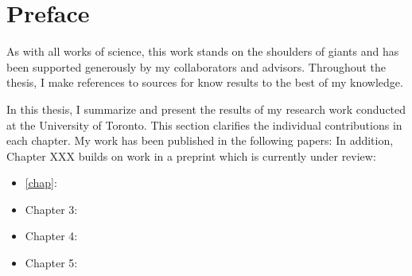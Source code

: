 \chapter*{Preface}

As with all works of science, this work stands on the shoulders of giants and has been supported generously by my collaborators and advisors.
Throughout the thesis, I make references to sources for know results to the best of my knowledge.


In this thesis, I summarize and present the results of my research work conducted at the University of Toronto.
This section clarifies the individual contributions in each chapter.
My work has been published in the following papers:
In addition, Chapter XXX builds on work in a preprint which is currently under review:

\begin{itemize}
    \item \autoref{chap}: 
    \item Chapter 3:
    \item Chapter 4:
    \item Chapter 5:
\end{itemize}

